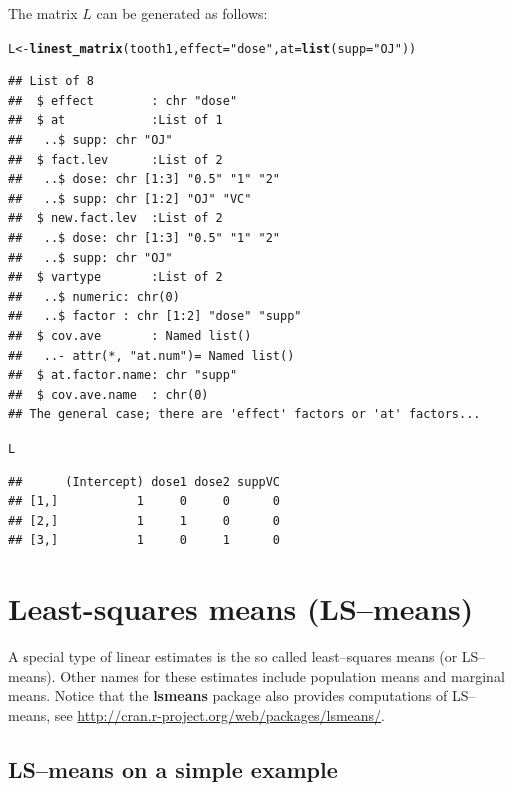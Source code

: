 \documentclass[10pt]{article}\usepackage[]{graphicx}\usepackage[]{color}
\makeatletter
\newcommand{\hlstr}[1]{\textcolor[rgb]{0.192,0.494,0.8}{#1}}%
\newcommand{\hlstd}[1]{\textcolor[rgb]{0.345,0.345,0.345}{#1}}%
\newcommand{\hlkwb}[1]{\textcolor[rgb]{0.69,0.353,0.396}{#1}}%
\newcommand{\hlkwc}[1]{\textcolor[rgb]{0.333,0.667,0.333}{#1}}%
\newcommand{\hlkwd}[1]{\textcolor[rgb]{0.737,0.353,0.396}{\textbf{#1}}}%
\newenvironment{kframe}{%
 \def\at@end@of@kframe{}%
 \ifinner\ifhmode%
  \def\at@end@of@kframe{\end{minipage}}%
  \begin{minipage}{\columnwidth}%
 \fi\fi%
 \def\FrameCommand##1{\hskip\@totalleftmargin \hskip-\fboxsep
 \colorbox{shadecolor}{##1}\hskip-\fboxsep
     \hskip-\linewidth \hskip-\@totalleftmargin \hskip\columnwidth}%
 \MakeFramed {\advance\hsize-\width
   \@totalleftmargin\z@ \linewidth\hsize
   \@setminipage}}%
 {\par\unskip\endMakeFramed%
 \at@end@of@kframe}
\newenvironment{knitrout}{}{} %
\def\pkg#1{{\bf #1}}
\makeatother
\begin{document}
The matrix $L$ can be generated as follows:
\begin{knitrout}
\color{fgcolor}\begin{kframe}
\begin{alltt}
\hlstd{L} \hlkwb{<-} \hlkwd{linest_matrix}\hlstd{(tooth1,} \hlkwc{effect}\hlstd{=}\hlstr{"dose"}\hlstd{,} \hlkwc{at}\hlstd{=}\hlkwd{list}\hlstd{(}\hlkwc{supp}\hlstd{=}\hlstr{"OJ"}\hlstd{))}
\end{alltt}
\begin{verbatim}
## List of 8
##  $ effect        : chr "dose"
##  $ at            :List of 1
##   ..$ supp: chr "OJ"
##  $ fact.lev      :List of 2
##   ..$ dose: chr [1:3] "0.5" "1" "2"
##   ..$ supp: chr [1:2] "OJ" "VC"
##  $ new.fact.lev  :List of 2
##   ..$ dose: chr [1:3] "0.5" "1" "2"
##   ..$ supp: chr "OJ"
##  $ vartype       :List of 2
##   ..$ numeric: chr(0) 
##   ..$ factor : chr [1:2] "dose" "supp"
##  $ cov.ave       : Named list()
##   ..- attr(*, "at.num")= Named list()
##  $ at.factor.name: chr "supp"
##  $ cov.ave.name  : chr(0) 
## The general case; there are 'effect' factors or 'at' factors...
\end{verbatim}
\begin{alltt}
\hlstd{L}
\end{alltt}
\begin{verbatim}
##      (Intercept) dose1 dose2 suppVC
## [1,]           1     0     0      0
## [2,]           1     1     0      0
## [3,]           1     0     1      0
\end{verbatim}
\end{kframe}
\end{knitrout}





\section{Least-squares means (LS--means)}
\label{sec:least-squares-means}

A special type of linear estimates is the so called least--squares
means (or LS--means). Other names for these estimates include
population means and marginal means. Notice that the \pkg{lsmeans} package
\cite{Lenth:2013} also provides computations of LS--means, see
\url{http://cran.r-project.org/web/packages/lsmeans/}.



\subsection{LS--means on a simple example}
\label{sec:ls-means-simple}
\end{document}
